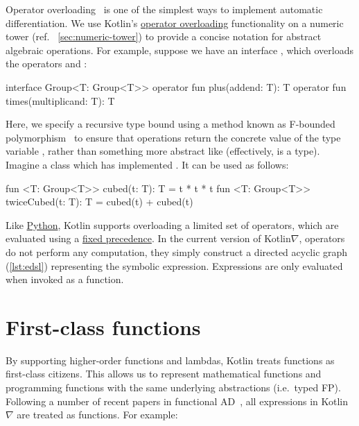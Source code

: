 \noindent Operator overloading~\citep{corliss1993operator} is one of the simplest ways to implement automatic differentiation. We use Kotlin's \href{https://kotlinlang.org/docs/reference/operator-overloading.html}{operator overloading} functionality on a numeric tower (ref. ~\autoref{sec:numeric-tower}) to provide a concise notation for abstract algebraic operations. For example, suppose we have an interface , which overloads the operators \inline{+} and \inline{*}:
%
\begin{kotlinlisting}
interface Group<T: Group<T>> {
    operator fun plus(addend: T): T
    operator fun times(multiplicand: T): T
}
\end{kotlinlisting}
%
Here, we specify a recursive type bound using a method known as F-bounded polymorphism~\citep{canning1989f} to ensure that operations return the concrete value of the type variable , rather than something more abstract like  (effectively,  is a  type). Imagine a class  which has implemented . It can be used as follows:
%
\begin{kotlinlisting}
fun <T: Group<T>> cubed(t: T): T = t * t * t
fun <T: Group<T>> twiceCubed(t: T): T = cubed(t) + cubed(t)
\end{kotlinlisting}
%
Like \href{https://docs.python.org/3/reference/datamodel.html#special-method-names}{Python}, Kotlin supports overloading a limited set of operators, which are evaluated using a \href{https://kotlinlang.org/docs/reference/grammar.html#precedence}{fixed precedence}. In the current version of Kotlin$\nabla$, operators do not perform any computation, they simply construct a directed acyclic graph (\autoref{lst:edsl}) representing the symbolic expression. Expressions are only evaluated when invoked as a function.

\section{First-class functions}\label{sec:first-class-functions}

By supporting higher-order functions and lambdas, Kotlin treats functions as first-class citizens. This allows us to represent mathematical functions and programming functions with the same underlying abstractions (i.e.\ typed FP). Following a number of recent papers in functional AD~\citep{pearlmutter2008reverse,wang2018backpropagation}, all expressions in Kotlin$\nabla$ are treated as functions. For example:

